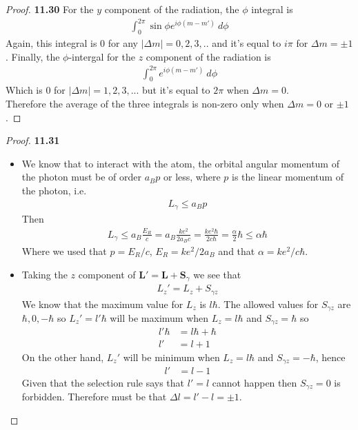 \documentclass[11pt]{article}
\theoremstyle{definition}
\begin{document}
\begin{proof}{\textbf{11.30}}
For the $y$ component of the radiation, the $\phi$ integral is
\begin{align*}
    \int_0^{2\pi} \sin\phi e^{i\phi(m-m')} ~ d\phi
\end{align*}
Again, this integral is 0 for any $|\Delta m| =0, 2, 3, ..$ and it's equal to
$i\pi$ for $\Delta m = \pm 1$.
Finally, the $\phi$-intergal for the $z$ component of the radiation is
\begin{align*}
    \int_0^{2\pi} e^{i\phi(m-m')} ~ d\phi
\end{align*}
Which is 0 for $|\Delta m| = 1, 2, 3, ...$ but it's equal to $2\pi$ when
$\Delta m = 0$.\\
Therefore the average of the three integrals is non-zero only when
$\Delta m = 0$ or $\pm 1$.
\end{proof}

\cleardoublepage
\begin{proof}{\textbf{11.31}}
\begin{itemize}
\item [\textbf{(a)}] We know that to interact with the atom, the orbital
angular momentum of the photon must be of order $a_B p$ or less, where $p$ is
the linear momentum of the photon, i.e.
\begin{align*}
    L_\gamma \leq a_B p 
\end{align*}
Then
\begin{align*}
    L_\gamma \leq a_B \frac{E_R}{c} = a_B\frac{ke^2}{2a_Bc}
    = \frac{ke^2\hbar}{2c\hbar} = \frac{\alpha}{2}\hbar \leq \alpha \hbar
\end{align*}
Where we used that $p = E_R/c$, $E_R = ke^2/2a_B$ and that
$\alpha = ke^2/c\hbar$.
\item [\textbf{(b)}] Taking the $z$ component of
$\bm{L'} = \bm{L} + \bm{S}_\gamma$ we see that
\begin{align*}
    L_z' = L_z + S_{\gamma z}
\end{align*}
We know that the maximum value for $L_z$ is $l \hbar$. The allowed values
for $S_{\gamma z}$ are $\hbar, 0, -\hbar$ so $L_z' = l'\hbar$ will be maximum when 
$L_z = l\hbar$ and $S_{\gamma z} = \hbar$ so
\begin{align*}
    l'\hbar &= l\hbar + \hbar \\
    l' &= l + 1
\end{align*}
On the other hand, $L_z'$ will be minimum when $L_z = l\hbar$ and
$S_{\gamma z} = -\hbar$, hence
\begin{align*}
    l' &= l - 1
\end{align*}
Given that the selection rule says that $l' = l$ cannot happen then
$S_{\gamma z} = 0$ is forbidden. Therefore must be that
$\Delta l = l' - l = \pm 1$.
\end{itemize}
\end{proof}
\end{document}
